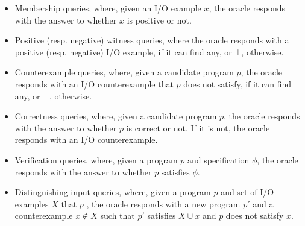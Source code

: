 \begin{itemize}
\item Membership queries, where, given an I/O example $x$, the oracle responds
  with the answer to whether $x$ is positive or not.
\item Positive (resp. negative) witness queries, where the oracle responds with a
  positive (resp. negative) I/O example, if it can find any, or $\bot$, otherwise.
\item Counterexample queries, where, given a candidate program $p$, the oracle
  responds with an I/O counterexample that $p$ does not satisfy, if it can find
  any, or $\bot$, otherwise.
\item Correctness queries, where, given a candidate program $p$, the oracle
  responds with the answer to whether $p$ is correct or not. If it is not, the
  oracle responds with an I/O counterexample.
\item Verification queries, where, given a program $p$ and specification $\phi$,
  the oracle responds with the answer to whether $p$ satisfies $\phi$.
\item Distinguishing input queries, where, given a program $p$ and set of I/O
  examples $X$ that $p$ , the oracle responds with a new program $p'$ and a
  counterexample $x \not\in X$ such that $p'$ satisfies $X \cup x$ and $p$ does not satisfy
  $x$.
\end{itemize}








